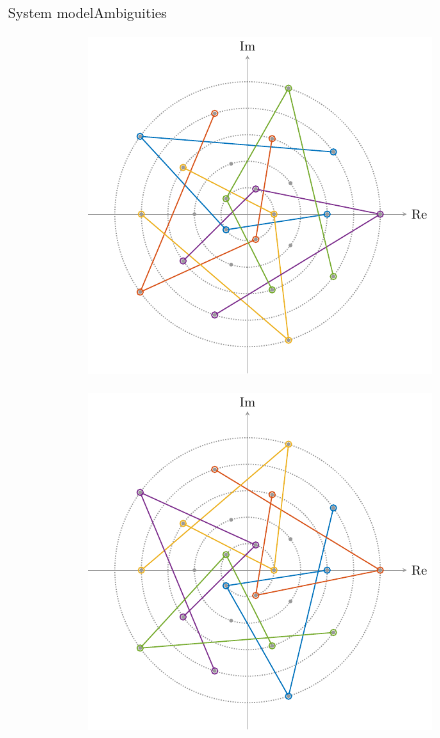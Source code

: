 \documentclass[en]{sdqbeamer}
\begin{document}
\begin{frame}{System model}{Ambiguities}
\begin{figure}[htb]
     \centering
     \begin{subfigure}[b]{0.4\textwidth}
         \centering
         \includegraphics[width=\textwidth]{Eq_class_construction_14.pdf}
     \end{subfigure}
     \hspace{10mm}
     \begin{subfigure}[b]{0.4\textwidth}
         \centering
         \includegraphics[width=\textwidth]{Eq_class_construction_15.pdf}
     \end{subfigure}
\end{figure}

\end{frame}
\end{document}
